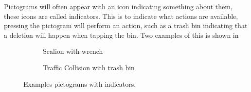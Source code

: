 Pictograms will often appear with an icon indicating something about them, these icons are called indicators.
This is to indicate what actions are available, pressing the pictogram will perform an action, such as a trash bin indicating that a deletion will happen when tapping the bin.
Two examples of this is shown in~

\begin{figure}[H]
    \centering
    \begin{subfigure}[b]{0.2\textwidth}
        \caption{Sealion with wrench}
        \label{fig:sealion-with-wrench}
    \end{subfigure}
    \qquad
    \begin{subfigure}[b]{0.2\textwidth}
        \caption{Traffic Collision with trash bin}
        \label{fig:trafficcollision-with-wrench}
    \end{subfigure}
    \caption{Examples pictograms with indicators.}\label{fig:pictograms_with_indicators}
\end{figure}